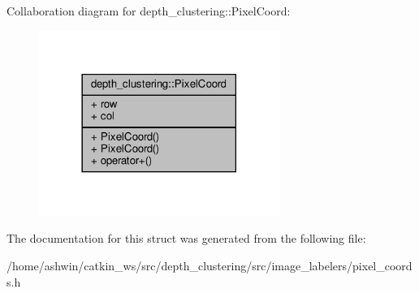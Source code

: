 Collaboration diagram for depth\+\_\+clustering\+:\+:Pixel\+Coord\+:\nopagebreak
\begin{figure}[H]
\begin{center}
\leavevmode
\includegraphics[width=222pt]{structdepth__clustering_1_1PixelCoord__coll__graph}
\end{center}
\end{figure}


The documentation for this struct was generated from the following file\+:\begin{DoxyCompactItemize}
\item 
/home/ashwin/catkin\+\_\+ws/src/depth\+\_\+clustering/src/image\+\_\+labelers/pixel\+\_\+coords.\+h\end{DoxyCompactItemize}
